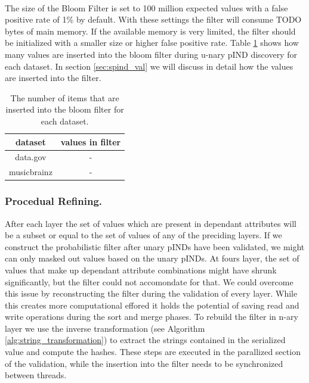 \noindent \\ The size of the Bloom Filter is set to 100 million expected values with a false positive rate of 1\% by default. With these settings the filter will consume TODO bytes of main memory. If the available memory is very limited, the filter should be initialized with a smaller size or higher false positive rate. Table \ref{tab:filter} shows how many values are inserted into the bloom filter during u-nary pIND discovery for each dataset. In section \ref{sec:spind_val} we will discuss in detail how the values are inserted into the filter.

\begin{table}
    \begin{tabular}{c|c}
     dataset & values in filter\\ 
     \hline\hline
     data.gov & - \\ 
     \hline
     musicbrainz & - \\
    \end{tabular}
    \caption{The number of items that are inserted into the bloom filter for each dataset.} \label{tab:filter}
\end{table}

\subsubsection{Procedual Refining.} After each layer the set of values which are present in dependant attributes will be a subset or equal to the set of values of any of the preciding layers. If we construct the probabilistic filter after unary pINDs have been validated, we might can only masked out values based on the unary pINDs. At fours layer, the set of values that make up dependant attribute combinations might have shrunk significantly, but the filter could not accomondate for that. We could overcome this issue by reconstructing the filter during the validation of every layer. While this creates more computational effored it holds the potential of saving read and write operations during the sort and merge phases. To rebuild the filter in n-ary layer we use the inverse transformation (see Algorithm \ref{alg:string_transformation}) to extract the strings contained in the serialized value and compute the hashes. These steps are executed in the parallized section of the validation, while the insertion into the filter needs to be synchronized between threads.

